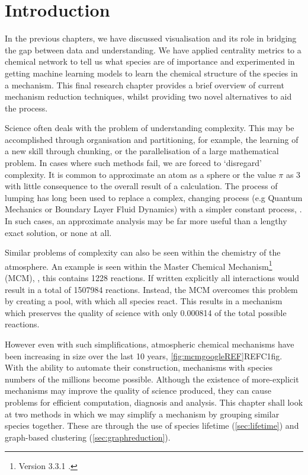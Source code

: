 
\section{Introduction}

In the previous chapters, we have discussed visualisation and its role in bridging the gap between data and understanding. We have applied centrality metrics to a chemical network to tell us what species are of importance and experimented in getting machine learning models to learn the chemical structure of the species in a mechanism. This final research chapter provides a brief overview of current mechanism reduction techniques, whilst providing two novel alternatives to aid the process.

Science often deals with the problem of understanding complexity. This may be accomplished through organisation and partitioning, for example, the learning of a new skill through chunking, or the parallelisation of a large mathematical problem. In cases where such methods fail, we are forced to `disregard' complexity. It is common to approximate an atom as a sphere or the value $\pi$ as 3 with little consequence to the overall result of a calculation. The process of lumping has long been used to replace a complex, changing process (e.g Quantum Mechanics or Boundary Layer Fluid Dynamics) with a simpler constant process, \citep{approx}. In such cases, an approximate analysis may be far more useful than a lengthy exact solution, or none at all. 

Similar problems of complexity can also be seen within the chemistry of the atmosphere. An example is seen within the Master Chemical Mechanism\footnote{Version 3.3.1 .} (MCM), \citep{mcm}, this contains 1228  reactions. If written explicitly all  interactions would result in a total of 1507984 reactions. Instead, the MCM overcomes this problem by creating a  pool, with which all  species react. This results in a mechanism which preserves the quality of science with only 0.000814 of the total possible  reactions.

However even with such simplifications, atmospheric chemical mechanisms have been increasing in size over the last 10 years, \autoref{fig:mcmgoogleREF}REFC1fig. With the ability to automate their construction, mechanisms with species numbers of the millions become possible. Although the existence of more-explicit mechanisms may improve the quality of science produced, they can cause problems for efficient computation, diagnosis and analysis. This chapter shall look at two methods in which we may simplify a mechanism by grouping similar species together. These are through the use of species lifetime (\autoref{sec:lifetime}) and graph-based clustering (\autoref{sec:graphreduction}).


